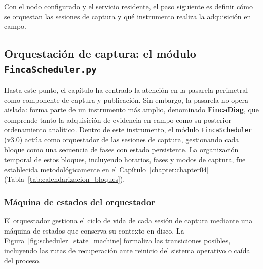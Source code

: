 Con el nodo configurado y el servicio residente, el paso siguiente es definir cómo se orquestan las sesiones de captura y qué instrumento realiza la adquisición en campo.

\subsection[Orquestación de captura]{Orquestación de captura: el módulo\\\texttt{FincaScheduler.py}}
Hasta este punto, el capítulo ha centrado la atención en la pasarela perimetral como componente de captura y publicación. Sin embargo, la pasarela no opera aislada: forma parte de un instrumento más amplio, denominado \textbf{FincaDiag}, que comprende tanto la adquisición de evidencia en campo como su posterior ordenamiento analítico. Dentro de este instrumento, el módulo \texttt{FincaScheduler} (v3.0) actúa como orquestador de las sesiones de captura, gestionando cada bloque como una secuencia de fases con estado persistente. La organización temporal de estos bloques, incluyendo horarios, fases y modos de captura, fue establecida metodológicamente en el Capítulo~\ref{chapter:chapter04} (Tabla~\ref{tab:calendarizacion_bloques}).

\subsubsection{Máquina de estados del orquestador}
El orquestador gestiona el ciclo de vida de cada sesión de captura mediante una máquina de estados que conserva su contexto en disco. La Figura~\ref{fig:scheduler_state_machine} formaliza las transiciones posibles, incluyendo las rutas de recuperación ante reinicio del sistema operativo o caída del proceso.

